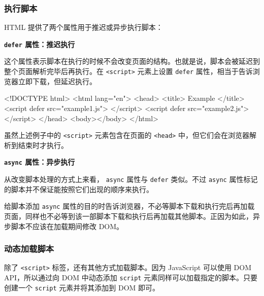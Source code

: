 \subsubsection*{执行脚本}

HTML 提供了两个属性用于推迟或异步执行脚本：

\noindent\textbf{\texttt{defer} 属性：推迟执行}

这个属性表示脚本在执行的时候不会改变页面的结构。也就是说，脚本会被延迟到整个页面解析完毕后再执行。在 \texttt{<script>} 元素上设置 \texttt{defer} 属性，相当于告诉浏览器立即下载，但延迟执行。

\begin{HTML}
<!DOCTYPE html>
<html lang="en">
  <head>
    <title> Example </title>
    <script defer src="example1.js"> </script>
    <script defer src="example2.js"> </script>
  </head>
  <body></body>
</html>
\end{HTML}

虽然上述例子中的 \texttt{<script>} 元素包含在页面的 \texttt{<head>} 中，但它们会在浏览器解析到结束时才执行。


\noindent\textbf{\texttt{async} 属性：异步执行}

从改变脚本处理的方式上来看， \texttt{async} 属性与 \texttt{defer} 类似。不过 \texttt{async} 属性标记的脚本并不保证能按照它们出现的顺序来执行。

给脚本添加 \texttt{async} 属性的目的时告诉浏览器，不必等脚本下载和执行完后再加载页面，同样也不必等到该一部脚本下载和执行后再加载其他脚本。正因为如此，异步脚本不应该在加载期间修改 DOM。


\subsubsection*{动态加载脚本}

除了 \texttt{<script>} 标签，还有其他方式加载脚本。因为 JavaScript 可以使用 DOM API，所以通过向 DOM 中动态添加 \texttt{script} 元素同样可以加载指定的脚本。只要创建一个 \texttt{script} 元素并将其添加到 DOM 即可。

